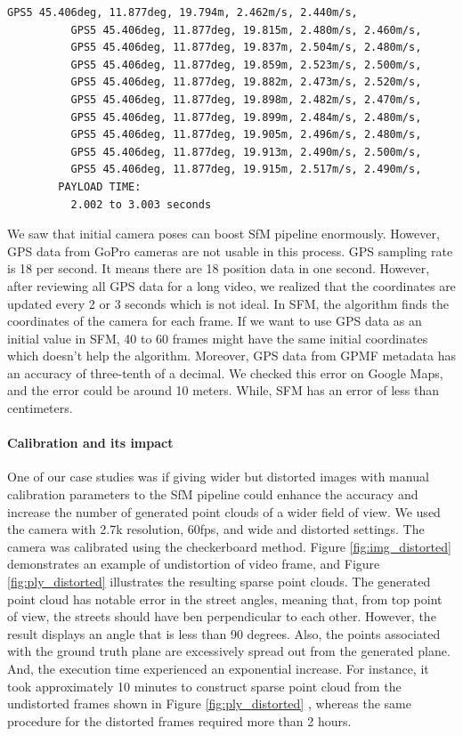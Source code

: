 \documentclass[11pt]{article}
\begin{document}
\begin{lstlisting}[language=bash,caption={gpmf-parser output},label={lst:lstlisting}]
          GPS5 45.406deg, 11.877deg, 19.794m, 2.462m/s, 2.440m/s,
          GPS5 45.406deg, 11.877deg, 19.815m, 2.480m/s, 2.460m/s,
          GPS5 45.406deg, 11.877deg, 19.837m, 2.504m/s, 2.480m/s,
          GPS5 45.406deg, 11.877deg, 19.859m, 2.523m/s, 2.500m/s,
          GPS5 45.406deg, 11.877deg, 19.882m, 2.473m/s, 2.520m/s,
          GPS5 45.406deg, 11.877deg, 19.898m, 2.482m/s, 2.470m/s,
          GPS5 45.406deg, 11.877deg, 19.899m, 2.484m/s, 2.480m/s,
          GPS5 45.406deg, 11.877deg, 19.905m, 2.496m/s, 2.480m/s,
          GPS5 45.406deg, 11.877deg, 19.913m, 2.490m/s, 2.500m/s,
          GPS5 45.406deg, 11.877deg, 19.915m, 2.517m/s, 2.490m/s,
        PAYLOAD TIME:
          2.002 to 3.003 seconds
    \end{lstlisting}

    We saw that initial camera poses can boost SfM pipeline enormously. However, GPS data from GoPro cameras
    are not usable in this process.
    GPS sampling rate is 18 per second. It means there are 18 position data in one second. However, after reviewing
    all GPS data for a long video, we realized that the coordinates are updated every 2 or 3 seconds which is not ideal.
    In SFM, the algorithm finds the coordinates of the camera for each frame. If we want to use GPS data as an initial
    value in SFM, 40 to 60 frames might have the same initial coordinates which doesn't help the algorithm.
    Moreover, GPS data from GPMF metadata has an accuracy of three-tenth of a decimal. We checked this error on
    Google Maps, and the error could be around 10 meters. While, SFM has an error of less than centimeters.

    \paragraph{Calibration and its impact}
    One of our case studies was if giving wider but distorted images with manual calibration parameters to the SfM pipeline
    could enhance the accuracy and increase the number of generated point clouds of a wider field of view. We used
    the camera with 2.7k resolution, 60fps, and wide and distorted settings. The camera was calibrated using the
    checkerboard method. Figure \ref{fig:img_distorted} demonstrates an example of undistortion of video frame,
    and Figure \ref{fig:ply_distorted} illustrates the resulting sparse point clouds.
    The generated point cloud has notable error in the street angles, meaning that, from top point of view, the
    streets should have ben perpendicular to each other. However, the result displays an angle that is less than 90 degrees.
    Also, the points associated with the ground truth plane are excessively spread out from the generated plane.
    And, the execution time experienced an exponential increase. For instance, it took approximately
    10 minutes to construct sparse point cloud from the undistorted frames shown in Figure \ref{fig:ply_distorted}
    , whereas the same procedure for the distorted frames required more than 2 hours.
\end{document}
